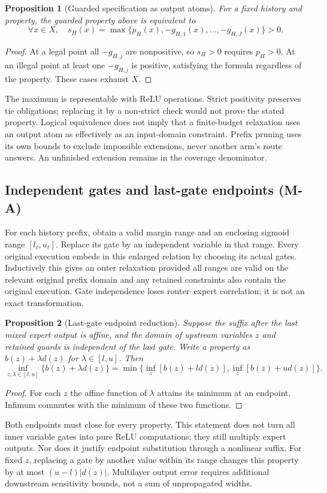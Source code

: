 \documentclass[11pt]{article}
\newtheorem{proposition}{Proposition}
\begin{document}
\begin{proposition}[Guarded specification as output atoms]
For a fixed history and property, the guarded property above is equivalent to
\[
 \forall x\in X,\quad
 s_H(x)=\max\{p_H(x),-g_{H,1}(x),\ldots,-g_{H,J}(x)\}>0.
\]
\end{proposition}
\begin{proof}
At a legal point all $-g_{H,j}$ are nonpositive, so $s_H>0$ requires $p_H>0$.
At an illegal point at least one $-g_{H,j}$ is positive, satisfying the formula
regardless of the property. These cases exhaust $X$.
\end{proof}
The maximum is representable with ReLU operations. Strict positivity preserves
tie obligations; replacing it by a non-strict check would not prove the stated
property. Logical equivalence does not imply that a finite-budget relaxation
uses an output atom as effectively as an input-domain constraint. Prefix pruning
uses its own bounds to exclude impossible extensions, never another arm's
route answers. An unfinished extension remains in the coverage denominator.

\subsection{Independent gates and last-gate endpoints (M-A)}
For each history prefix, obtain a valid margin range and an enclosing sigmoid
range $[l_\ell,u_\ell]$. Replace its gate by an independent variable in that
range. Every original execution embeds in this enlarged relation by choosing
its actual gates. Inductively this gives an outer relaxation provided all
ranges are valid on the relevant original prefix domain and any retained
constraints also contain the original execution. Gate independence loses
router--expert correlation; it is not an exact transformation.

\begin{proposition}[Last-gate endpoint reduction]
Suppose the suffix after the last mixed expert output is affine, and the domain
of upstream variables $z$ and retained guards is independent of the last gate.
Write a property as $b(z)+\lambda d(z)$ for $\lambda\in[l,u]$. Then
\[
 \inf_{z,\lambda\in[l,u]}\{b(z)+\lambda d(z)\}
 =\min\{\inf_z[b(z)+l d(z)],\inf_z[b(z)+u d(z)]\}.
\]
\end{proposition}
\begin{proof}
For each $z$ the affine function of $\lambda$ attains its minimum at an
endpoint. Infimum commutes with the minimum of these two functions.
\end{proof}
Both endpoints must close for every property. This statement does not turn
all inner variable gates into pure ReLU computations; they still multiply
expert outputs. Nor does it justify endpoint substitution through a nonlinear
suffix. For fixed $z$, replacing a gate by another value within its range
changes this property by at most $(u-l)|d(z)|$. Multilayer output error requires
additional downstream sensitivity bounds, not a sum of unpropagated widths.
\end{document}
